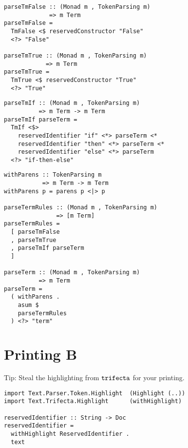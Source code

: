 \documentclass{beamer}
\begin{document}
\begin{frame}[fragile]
  \begin{verbatim}
parseTmFalse :: (Monad m , TokenParsing m)
             => m Term           
parseTmFalse =
  TmFalse <$ reservedConstructor "False"
  <?> "False"

parseTmTrue :: (Monad m , TokenParsing m)
            => m Term
parseTmTrue =
  TmTrue <$ reservedConstructor "True"
  <?> "True"
  \end{verbatim}
\end{frame} 

\begin{frame}[fragile]
  \begin{verbatim}
parseTmIf :: (Monad m , TokenParsing m)
          => m Term -> m Term
parseTmIf parseTerm =
  TmIf <$>
    reservedIdentifier "if" <*> parseTerm <*
    reservedIdentifier "then" <*> parseTerm <*
    reservedIdentifier "else" <*> parseTerm
  <?> "if-then-else"
  \end{verbatim}
\end{frame} 

\begin{frame}[fragile]
  \begin{verbatim}
withParens :: TokenParsing m 
           => m Term -> m Term
withParens p = parens p <|> p

parseTermRules :: (Monad m , TokenParsing m)
               => [m Term]
parseTermRules =
  [ parseTmFalse
  , parseTmTrue
  , parseTmIf parseTerm
  ]

parseTerm :: (Monad m , TokenParsing m)
          => m Term
parseTerm =
  ( withParens .
    asum $
    parseTermRules
  ) <?> "term"
  \end{verbatim}
\end{frame} 

\section{Printing B}

\begin{frame}[c]
  \begin{center}
Tip: Steal the highlighting from $\tt{trifecta}$ for your printing.
  \end{center}
\end{frame}

\begin{frame}[fragile]
  \begin{verbatim}
import Text.Parser.Token.Highlight  (Highlight (..))
import Text.Trifecta.Highlight      (withHighlight)

reservedIdentifier :: String -> Doc
reservedIdentifier =
  withHighlight ReservedIdentifier .
  text
  \end{verbatim}
\end{frame} 
\end{document}
